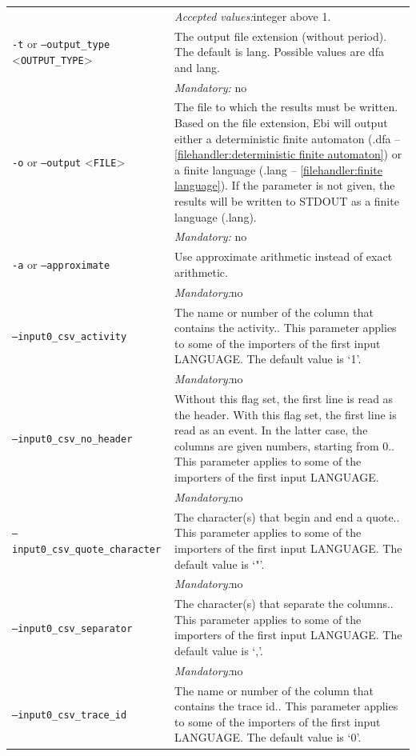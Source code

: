 {\begin{tabularx}{\linewidth}{lX}
&\textit{Accepted values:}\quad integer above 1.\\
\texttt{-t} or \texttt{--output\_type} <\texttt{OUTPUT\_TYPE}> &
The output file extension (without period). The default is lang. Possible values are dfa and lang.\\
&\textit{Mandatory:} \quad no\\
\texttt{-o} or \texttt{--output} <\texttt{FILE}> &
The file to which the results must be written. Based on the file extension, Ebi will output either a deterministic finite automaton (.dfa -- \cref{filehandler:deterministic finite automaton}) or a finite language (.lang -- \cref{filehandler:finite language}).
If the parameter is not given, the results will be written to STDOUT as a finite language (.lang).\\
&\textit{Mandatory:} \quad no\\
\texttt{-a} or \texttt{--approximate} & Use approximate arithmetic instead of exact arithmetic.\\
&\textit{Mandatory:}\quad no\\
\texttt{--input0\_csv\_activity} & The name or number of the column that contains the activity.. This parameter applies to some of the importers of the first input LANGUAGE. The default value is `1'.\\
&\textit{Mandatory:}\quad no\\
\texttt{--input0\_csv\_no\_header} & Without this flag set, the first line is read as the header. 
    With this flag set, the first line is read as an event. In the latter case, the columns are given numbers, starting from 0.. This parameter applies to some of the importers of the first input LANGUAGE. \\
&\textit{Mandatory:}\quad no\\
\texttt{--input0\_csv\_quote\_character} & The character(s) that begin and end a quote.. This parameter applies to some of the importers of the first input LANGUAGE. The default value is `"'.\\
&\textit{Mandatory:}\quad no\\
\texttt{--input0\_csv\_separator} & The character(s) that separate the columns.. This parameter applies to some of the importers of the first input LANGUAGE. The default value is `,'.\\
&\textit{Mandatory:}\quad no\\
\texttt{--input0\_csv\_trace\_id} & The name or number of the column that contains the trace id.. This parameter applies to some of the importers of the first input LANGUAGE. The default value is `0'.\\

\end{tabularx}}
